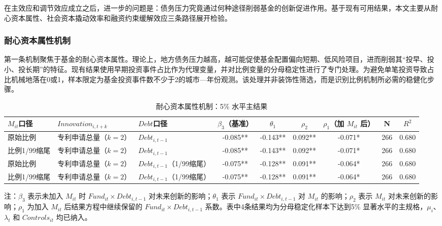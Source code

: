 在主效应和调节效应成立之后，进一步的问题是：债务压力究竟通过何种途径削弱基金的创新促进作用。基于现有可用结果，本文主要从耐心资本属性、社会资本撬动效率和融资约束缓解效应三条路径展开检验。

\subsubsection{耐心资本属性机制}

第一条机制聚焦于基金的耐心资本属性。理论上，地方债务压力越高，越可能促使基金配置偏向短期、低风险项目，进而削弱其“投早、投小、投长期”的特征。现有结果使用早期投资事件占比作为代理变量，并对比例变量的分母稳定性进行了专门处理。为避免单笔投资导致占比机械地落在0或1，样本限定为基金投资事件数不少于2的城市—年份观测。该处理并非装饰性筛选，而是识别比例机制所必需的稳健化步骤。

\begin{table}[htbp]
  \centering
  \caption{耐心资本属性机制：5\% 水平主结果}
  {\fangsong{}
  \begin{tabular}{l l l c c c c c c}
    \toprule
    $M_{it}$口径 & $Innovation_{i,t+k}$ & $Debt$口径 & $\beta_3$（基准） & $\theta_1$ & $\rho_2$ & $\rho_1$（加 $M_{it}$ 后） & N & $R^2$ \\
    \midrule
    原始比例 & 专利申请总量（$k=2$） & $Debt_{i,t-1}$ & -0.085** & -0.143** & 0.092** & -0.071* & 266 & 0.680 \\
    比例1/99缩尾 & 专利申请总量（$k=2$） & $Debt_{i,t-1}$ & -0.085** & -0.143** & 0.092** & -0.071* & 266 & 0.680 \\
    原始比例 & 专利申请总量（$k=2$） & $Debt_{i,t-1}$（1/99缩尾） & -0.075** & -0.128** & 0.091** & -0.064* & 266 & 0.680 \\
    比例1/99缩尾 & 专利申请总量（$k=2$） & $Debt_{i,t-1}$（1/99缩尾） & -0.075** & -0.128** & 0.091** & -0.064* & 266 & 0.680 \\
    \bottomrule
  \end{tabular}%

  \par\smallskip
  {\songti{}注：$\beta_3$ 表示未加入 $M_{it}$ 时 $Fund_{it}\times Debt_{i,t-1}$ 对未来创新的影响；$\theta_1$ 表示 $Fund_{it}\times Debt_{i,t-1}$ 对 $M_{it}$ 的影响；$\rho_2$ 表示 $M_{it}$ 对未来创新的影响；$\rho_1$ 为加入 $M_{it}$ 后结果方程中继续保留的 $Fund_{it}\times Debt_{i,t-1}$ 系数。表中4条结果均为分母稳定化样本下达到5\% 显著水平的主规格，$\mu_i$、$\lambda_t$ 和 $Controls_{it}$ 均已纳入。}
  }
\end{table}

